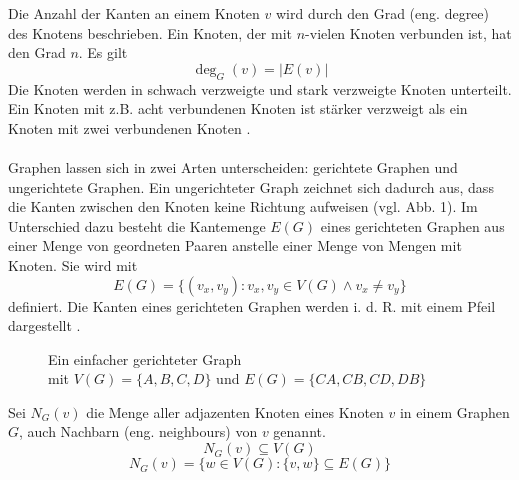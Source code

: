 \noindent Die Anzahl der Kanten an einem Knoten $v$ wird durch den Grad (\acrshort{eng.} degree) des Knotens beschrieben. 
Ein Knoten, der mit $n$-vielen Knoten verbunden ist, hat den Grad $n$. Es gilt
$$\deg_G(v) = |E(v)|$$
Die Knoten werden in schwach verzweigte und stark verzweigte Knoten unterteilt. 
Ein Knoten mit z.B. acht verbundenen Knoten ist stärker verzweigt als ein Knoten mit zwei verbundenen Knoten \parencite[5]{Diestel2017-bj}.\\\\
Graphen lassen sich in zwei Arten unterscheiden: gerichtete Graphen und ungerichtete Graphen. Ein ungerichteter Graph zeichnet sich dadurch aus, dass die Kanten zwischen den Knoten keine Richtung aufweisen (\acrshort{vgl.} Abb. 1). Im Unterschied dazu besteht die Kantemenge $E(G)$ eines gerichteten Graphen aus einer Menge von geordneten Paaren anstelle einer Menge von Mengen mit Knoten. Sie wird mit
\begin{equation*}
    E(G) = \{(v_x, v_y) \colon v_x,v_y \in V(G) \wedge v_x \neq v_y\}
\end{equation*}
definiert. Die Kanten eines gerichteten Graphen werden \acrshort{i. d. R.} mit einem Pfeil dargestellt \parencite[30]{Diestel2017-bj}.
\begin{figure}[H]
    \centering
    
    \caption[Gerichteter Graph]{Ein einfacher gerichteter Graph\\ mit $V(G)=\{A,B,C,D\}$ und $E(G)=\{CA,CB,CD,DB\}$}
    \label{g2}
\end{figure}
\noindent Sei $N_G(v)$ die Menge aller adjazenten Knoten eines Knoten $v$ in einem Graphen $G$, auch Nachbarn (\acrshort{eng.} neighbours) von $v$ genannt. \parencite[5]{Diestel2017-bj}
\begin{equation*}
    N_G(v) \subseteq V(G)
\end{equation*}
\begin{equation*}
    N_G(v)=\{w \in V(G) \colon \{v,w\} \subseteq E(G)  \}
\end{equation*}

